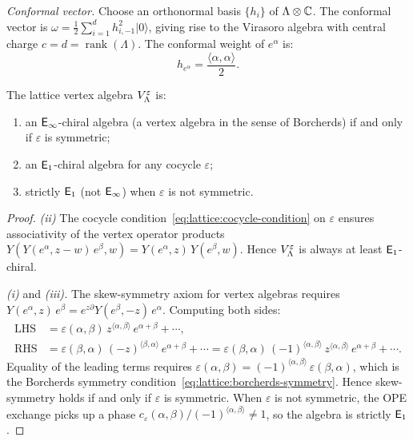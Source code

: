 \begin{construction}
\noindent\emph{Conformal vector.}
Choose an orthonormal basis $\{h_i\}$ of $\Lambda \otimes \mathbb{C}$.
The conformal vector is
$\omega = \frac{1}{2}\sum_{i=1}^d h_{i,{-1}}^2 |0\rangle$,
giving rise to the Virasoro algebra with central charge $c = d = \operatorname{rank}(\Lambda)$.
The conformal weight of $e^\alpha$ is:
\begin{equation}\label{eq:lattice:conformal-weight}
h_{e^\alpha} = \frac{\langle\alpha,\alpha\rangle}{2}.
\end{equation}
\end{construction}

\begin{theorem}
\label{thm:lattice:e1-vs-einf}
The lattice vertex algebra $V_\Lambda^\varepsilon$ is:
\begin{enumerate}[label=(\roman*)]
\item an $\mathsf{E}_{\infty}$-chiral algebra (a vertex algebra in the sense of
  Borcherds) if and only if $\varepsilon$ is symmetric;
\item an $\mathsf{E}_1$-chiral algebra for any cocycle $\varepsilon$;
\item strictly $\mathsf{E}_1$ (not $\mathsf{E}_{\infty}$) when $\varepsilon$ is not symmetric.
\end{enumerate}
\end{theorem}

\begin{proof}
\emph{(ii)} The cocycle condition~\eqref{eq:lattice:cocycle-condition}
on $\varepsilon$ ensures associativity of the vertex operator products
$Y(Y(e^\alpha,z-w)\,e^\beta, w) = Y(e^\alpha, z)\,Y(e^\beta, w)$.
Hence $V_\Lambda^\varepsilon$ is always at least $\mathsf{E}_1$-chiral.

\emph{(i)} and \emph{(iii).} The skew-symmetry axiom for vertex
algebras requires
$Y(e^\alpha, z)\, e^\beta = e^{z\partial} Y(e^\beta, -z)\, e^\alpha$.
Computing both sides:
\begin{align*}
\text{LHS}
&= \varepsilon(\alpha,\beta)\, z^{\langle\alpha,\beta\rangle}\,
  e^{\alpha+\beta} + \cdots, \\
\text{RHS}
&= \varepsilon(\beta,\alpha)\, (-z)^{\langle\beta,\alpha\rangle}\,
  e^{\alpha+\beta} + \cdots
= \varepsilon(\beta,\alpha)\,(-1)^{\langle\alpha,\beta\rangle}\,
  z^{\langle\alpha,\beta\rangle}\, e^{\alpha+\beta} + \cdots.
\end{align*}
Equality of the leading terms requires
$\varepsilon(\alpha,\beta) =
(-1)^{\langle\alpha,\beta\rangle}\,\varepsilon(\beta,\alpha)$,
which is the Borcherds symmetry condition~\eqref{eq:lattice:borcherds-symmetry}.
Hence skew-symmetry holds if and only if $\varepsilon$ is symmetric.
When $\varepsilon$ is not symmetric, the OPE exchange picks up a phase
$c_\varepsilon(\alpha,\beta)/(-1)^{\langle\alpha,\beta\rangle} \neq 1$,
so the algebra is strictly $\mathsf{E}_1$.
\end{proof}


